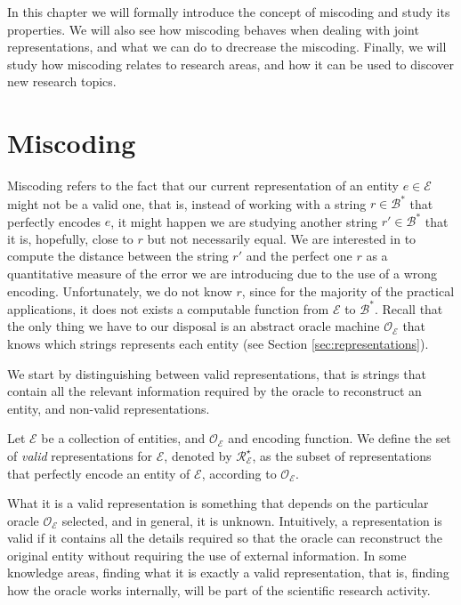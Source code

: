 In this chapter we will formally introduce the concept of miscoding and study its properties. We will also see how miscoding behaves when dealing with joint representations, and what we can do to drecrease the miscoding. Finally, we will study how miscoding relates to research areas, and how it can be used to discover new research topics.

%
%
\section{Miscoding}
\label{sec:miscoding}

Miscoding refers to the fact that our current representation of an entity $e \in \mathcal{E}$ might not be a valid one, that is, instead of working with a string $r \in \mathcal{B}^\ast$ that perfectly encodes $e$, it might happen we are studying another string $r' \in \mathcal{B}^\ast$ that it is, hopefully, close to $r$ but not necessarily equal. We are interested in to compute the distance between the string $r'$ and the perfect one $r$ as a quantitative measure of the error we are introducing due to the use of a wrong encoding. Unfortunately, we do not know $r$, since for the majority of the practical applications, it does not exists a computable function from $\mathcal{E}$ to $\mathcal{B}^\ast$. Recall that the only thing we have to our disposal is an abstract oracle machine $\mathcal{O}_\mathcal{E}$ that knows which strings represents each entity (see Section \ref{sec:representations}).

We start by distinguishing between valid representations, that is strings that contain all the relevant information required by the oracle to reconstruct an entity, and non-valid representations.

\begin{definition}
Let $\mathcal{E}$ be a collection of entities, and $\mathcal{O}_\mathcal{E}$ and encoding function. We define the set of \emph{valid} representations for $\mathcal{E}$, denoted by $\mathcal{R}^\star_\mathcal{E}$, as the subset of representations that perfectly encode an entity of $\mathcal{E}$, according to $\mathcal{O}_\mathcal{E}$.
\end{definition}

What it is a valid representation is something that depends on the particular oracle $\mathcal{O}_\mathcal{E}$ selected, and in general, it is unknown. Intuitively, a representation is valid if it contains all the details required so that the oracle can reconstruct the original entity without requiring the use of external information. In some knowledge areas, finding what it is exactly a valid representation, that is, finding how the oracle works internally, will be part of the scientific research activity.

